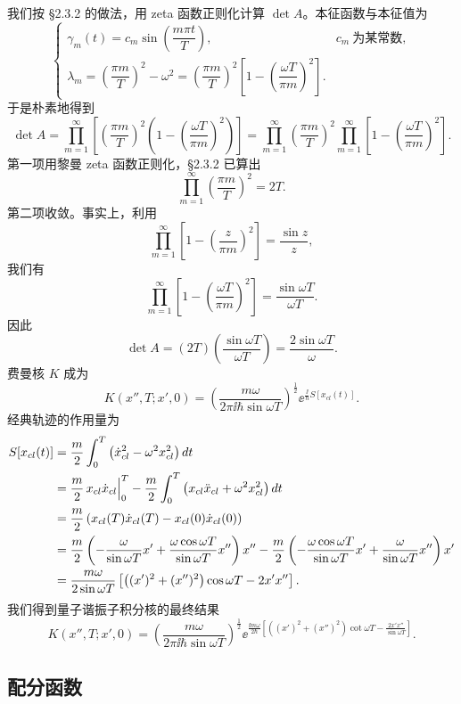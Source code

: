 我们按 §2.3.2 的做法，用 zeta 函数正则化计算 $\det A$。本征函数与本征值为
\[
\begin{cases}
\gamma_m(t)=c_m\sin\left(\dfrac{m\pi t}{T}\right), & c_m\ \text{为某常数},\\[2mm]
\lambda_m=\left(\dfrac{\pi m}{T}\right)^2-\omega^2
=\left(\dfrac{\pi m}{T}\right)^2\left[1-\left(\dfrac{\omega T}{\pi m}\right)^2\right]. &
\end{cases}
\]
于是朴素地得到
\[
\det A=\prod_{m=1}^\infty\left[\left(\frac{\pi m}{T}\right)^2
\left(1-\left(\frac{\omega T}{\pi m}\right)^2\right)\right]
=\prod_{m=1}^\infty\left(\frac{\pi m}{T}\right)^2
\prod_{m=1}^\infty\left[1-\left(\frac{\omega T}{\pi m}\right)^2\right].
\]
第一项用黎曼 zeta 函数正则化，§2.3.2 已算出
\[
\prod_{m=1}^\infty\left(\frac{\pi m}{T}\right)^2=2T.
\]
第二项收敛。事实上，利用
\[
\prod_{m=1}^\infty\left[1-\left(\frac{z}{\pi m}\right)^2\right]=\frac{\sin z}{z},
\]
我们有
\[
\prod_{m=1}^\infty\left[1-\left(\frac{\omega T}{\pi m}\right)^2\right]
=\frac{\sin\omega T}{\omega T}.
\]
因此
\[
\det A=(2T)\left(\frac{\sin\omega T}{\omega T}\right)=\frac{2\sin\omega T}{\omega}.
\]
费曼核 $K$ 成为
\[
K(x'',T;x',0)=\left(\frac{m\omega}{2\pi\ii\hbar\sin\omega T}\right)^{\frac12}
\ee^{\frac{\ii}{\hbar}S[x_{cl}(t)]}.
\]
经典轨迹的作用量为
\[
\begin{aligned}
S[x_{cl}(t)]
&=\frac m2\int_0^T\left(\dot x_{cl}^2-\omega^2x_{cl}^2\right)d t\\
&=\frac m2\,x_{cl}\dot x_{cl}\Big|_0^T
-\frac m2\int_0^T\left(x_{cl}\ddot x_{cl}+\omega^2x_{cl}^2\right)d t\\
&=\frac m2\left(x_{cl}(T)\dot x_{cl}(T)-x_{cl}(0)\dot x_{cl}(0)\right)\\
&=\frac m2\left(-\frac{\omega}{\sin\omega T}x'
+\frac{\omega\cos\omega T}{\sin\omega T}x''\right)x''
-\frac m2\left(-\frac{\omega\cos\omega T}{\sin\omega T}x'
+\frac{\omega}{\sin\omega T}x''\right)x'\\
&=\frac{m\omega}{2\sin\omega T}\left[\left((x')^2+(x'')^2\right)\cos\omega T-2x'x''\right].
\end{aligned}
\]
我们得到量子谐振子积分核的最终结果
\[
K(x'',T;x',0)=\left(\frac{m\omega}{2\pi\ii\hbar\sin\omega T}\right)^{\frac12}
\ee^{\frac{\ii m\omega}{2\hbar}\left[\left((x')^2+(x'')^2\right)\cot\omega T
-\frac{2x'x''}{\sin\omega T}\right]}.
\]

\subsection{配分函数}


